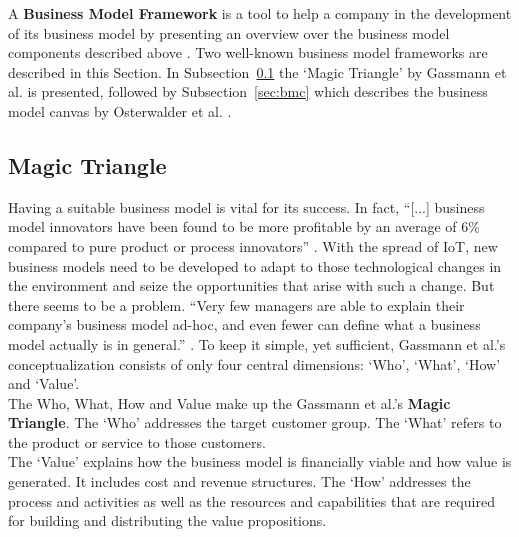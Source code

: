	A \textbf{Business Model Framework} is a tool to help a company in the development of its business model by presenting an overview over the business model components described above \cite{dijkman}. Two well-known business model frameworks are described in this Section. In Subsection~\ref{sec:mt} the `Magic Triangle' by Gassmann et al. \cite{gassmann55} is presented, followed by Subsection~\ref{sec:bmc} which describes the business model canvas by Osterwalder et al. \cite{osterwalder}.
	\vspace{-1em}
	\subsection{Magic Triangle}
	\label{sec:mt}
	\vspace{-1em}
		Having a suitable business model is vital for its success. In fact, ``[...] business model innovators have been found to be more profitable by an average of 6\% compared to pure product or process innovators'' \cite{gassmann55}. With the spread of IoT, new business models need to be developed to adapt to those technological changes in the environment and seize the opportunities that arise with such a change. But there seems to be a problem. ``Very few managers are able to explain their company's business model ad-hoc, and even fewer can define what a business model actually is in general.'' \cite{gassmann55}. To keep it simple, yet sufficient, Gassmann et al.'s conceptualization consists of only four central dimensions: `Who', `What', `How' and `Value'. \\
		The Who, What, How and Value make up the Gassmann et al.'s \textbf{Magic Triangle}. The `Who' addresses the target customer group. The `What' refers to the product or service to those customers.\\ 
		The `Value' explains how the business model is financially viable and how value is generated. It includes cost and revenue structures. The `How' addresses the process and activities as well as the resources and capabilities that are required for building and distributing the value propositions.

